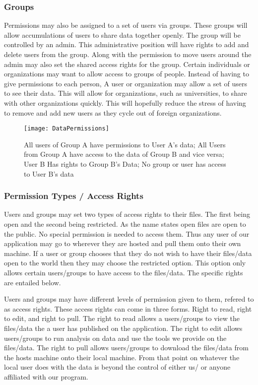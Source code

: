\subsubsection{Groups}
Permissions may also be assigned to a set of users via groups. These groups will allow accumulations of users to share data together openly. The group will be controlled by an admin. This administrative position will have rights to add and delete users from the group. Along with the permission to move users around the admin may also set the shared access rights for the group. Certain individuals or organizations may want to allow access to groups of people. Instead of having to give permissions to each person, A user or organization may allow a set of users to see their data. This will allow for organizations, such as universities, to share with other organizations quickly. This will hopefully reduce the stress of having to remove and add new users as they cycle out of foreign organizations.

\begin{figure}[t]
  \begin{center}
  \captionsetup{width=.8\linewidth}
  \texttt{[image: DataPermissions]}
  \caption{All users of Group A have permissions to User A's data; All Users from Group A have access to the data of Group B and vice versa; User B Has rights to Group B's Data; No group or user has access to User B's data}
  \end{center}
\end{figure}

\newpage
\subsubsection{Permission Types / Access Rights}
Users and groups may set two types of access rights to their files. The first being open and the second being restricted. As the name states open files are open to the public. No special permission is needed to access them. Thus any user of our application may go to wherever they are hosted and pull them onto their own machine. If a user or group chooses that they do not wish to have their files/data open to the world then they may choose the restricted option. This option only allows certain users/groups to have access to the files/data. The specific rights are entailed below.\par
Users and groups may have different levels of permission given to them, refered to as access rights. These access rights can come in three forms. Right to read, right to edit, and right to pull. The right to read allows a users/groups to view the files/data the a user has published on the application. The right to edit allows users/groups to run analysis on data and use the tools we provide on the files/data. The right to pull allows users/groups to download the files/data from the hosts machine onto their local machine. From that point on whatever the local user does with the data is beyond the control of either us/ or anyone affiliated with our program.

